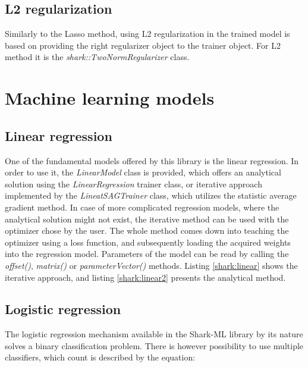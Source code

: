 \subsection{L2 regularization}

Similarly to the Lasso method, using L2 regularization in the trained model is based on providing the right regularizer object to the trainer object. For L2 method it is the \textit{shark::TwoNormRegularizer} class.

\section{Machine learning models}

\subsection{Linear regression}

One of the fundamental models offered by this library is the linear regression. In order to use it, the \textit{LinearModel} class is provided, which offers an analytical solution using the \textit{LinearRegression} trainer class, or iterative approach implemented by the \textit{LineatSAGTrainer} class, which utilizes the statistic average gradient method. In case of more complicated regression models, where the analytical solution might not exist, the iterative method can be used with the optimizer chose by the user. The whole method comes down into teaching the optimizer using a loss function, and subsequently loading the acquired weights into the regression model. Parameters of the model can be read by calling the \textit{offset()}, \textit{matrix()} or \textit{parameterVector()} methods. Listing \ref{shark:linear} shows the iterative approach, and listing \ref{shark:linear2} presents the analytical method. 



\subsection{Logistic regression}

The logistic regression mechanism available in the Shark-ML library by its nature solves a binary classification problem. There is however possibility to use multiple classifiers, which count is described by the equation:

